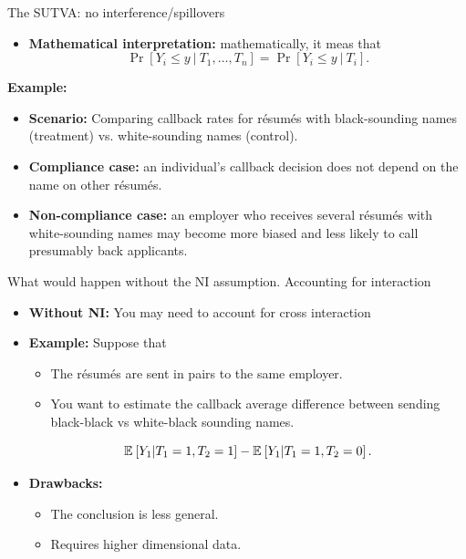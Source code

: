\documentclass[aspectratio=169]{beamer}
\begin{document}
\begin{frame}{The SUTVA: no interference/spillovers}

\begin{itemize}
    \item \textbf{Mathematical interpretation:} mathematically, it meas that
    $$
    \Pr[Y_i \leq y\ |\ T_1, \dots, T_n] = \Pr[Y_i \leq y\ |\ T_i].
    $$
\end{itemize}

\textbf{Example:}
\begin{itemize}
    \item \textbf{Scenario:} Comparing callback rates for résumés with black-sounding names (treatment) vs. white-sounding names (control).
    \item \textbf{Compliance case:} an individual’s callback decision does not depend on the name on other résumés.
    \item \textbf{Non-compliance case:} an employer who receives several résumés with white-sounding names may become more biased and less likely to call presumably back applicants.
\end{itemize}

\end{frame}

\begin{frame}{What would happen without the NI assumption. Accounting for interaction}

    \begin{itemize}
        \item \textbf{Without NI:} You may need to account for cross interaction
        \item \textbf{Example:} Suppose that 
        \begin{itemize}
            \item[$\bullet$] The résumés are sent in pairs to the same employer. 
            \item[$\bullet$] You want to estimate the callback average difference between sending black-black vs white-black sounding names.
        \end{itemize}
        $$
        \Esp[Y_1 | T_1 = 1, T_2 = 1] - \Esp[Y_1 | T_1 = 1, T_2 = 0].
        $$
        \item \textbf{Drawbacks:} 
        \begin{itemize}
            \item[$\bullet$] The conclusion is less general.
            \item[$\bullet$] Requires higher dimensional data.
        \end{itemize}
    \end{itemize}
      
\end{frame}
\end{document}

